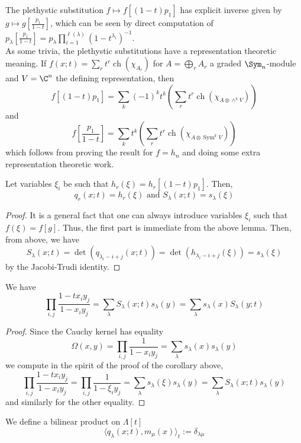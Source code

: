 \documentclass[11pt,leqno,oneside]{amsart}
\numberwithin{thm}{section}
\newcommand{\SymP}{\operatorname{Sym}}
\newcommand{\ExtP}{\wedge}
\newcommand{\sym}{\Lambda}
\newcommand{\ch}{\operatorname{ch}}
\begin{document}
\begin{rmk}\label{plethystic-inverses}
  The plethystic substitution \(f \mapsto f[(1-t)p_1]\) has explicit
  inverse given by \(g \mapsto g[\frac{p_1}{1-t}]\), which can be seen
  by direct computation of \(p_\lambda[\frac{p_1}{1-t}] =
  p_\lambda \prod_{i=1}^{\ell(\lambda)} (1-t^{\lambda_i})^{-1 }\). \\

  As some trivia, the plethystic substitutions have a representation
  theoretic meaning. If \(f(x;t) = \sum_r t^r \ch(\chi_{A_r})\) for \(A =
  \bigoplus_r A_r\) a graded \(\Sym_n\)-module and \(V = \C^n\) the
  defining representation, then \[
    f[(1-t)p_1] = \sum_k (-1)^k t^k \left( \sum_r t^r \ch(\chi_{A
        \otimes \ExtP^k V}) \right) 
  \]
  and \[
    f[\frac{p_1}{1-t}] = \sum_k t^k \left( \sum_r t^r \ch(\chi_{A
        \otimes \SymP^k V}) \right)
  \]
  which follows from proving the result for \(f = h_n\) and doing some
  extra representation theoretic work.
\end{rmk}
\begin{cor}
  Let variables \(\xi_i\) be such that \(h_r(\xi) =
  h_r[(1-t)p_1]\). Then, \[
    q_r(x;t) = h_r(\xi) \text{ and } S_\lambda(x;t) = s_\lambda(\xi)
  \]
\end{cor}
\begin{proof}
  It is a general fact that one can always introduce variables
  \(\xi_i\) such that \(f(\xi) = f[g]\). Thus, the first part is
  immediate from the above lemma. Then, from above, we have \[
    S_\lambda(x;t) = \det(q_{\lambda_i-i+j}(x;t)) =
    \det(h_{\lambda_i-i+j}(\xi)) = s_\lambda(\xi)
  \]
  by the Jacobi-Trudi identity.
\end{proof}
\begin{prop}
  We have \[
    \prod_{i,j} \frac{1-t x_i y_j}{1- x_i y_j} = \sum_{\lambda}
    S_\lambda(x;t) s_\lambda(y) = \sum_\lambda s_\lambda(x) S_\lambda(y;t)
  \]
\end{prop}
\begin{proof}
  Since the Cauchy kernel has equality \[
    \Omega(x,y) = \prod_{i,j} \frac{1}{1-x_i y_j} = \sum_{\lambda} s_\lambda(x) s_\lambda(y)
  \]
  we compute in the spirit of the proof of the corollary above, \[
    \prod_{i,j} \frac{1-t x_i y_j}{1- x_i y_j} = \prod_{i,j}
    \frac{1}{1-\xi_i y_j} = \sum_{\lambda} s_\lambda(\xi) s_\lambda(y)
    = \sum_{\lambda} S_\lambda(x;t) s_\lambda(y)
  \]
  and similarly for the other equality.
\end{proof}
\begin{defn}
  We define a bilinear product on \(\sym[t]\) \[
    \langle q_\lambda(x;t), m_\mu(x) \rangle_t := \delta_{\lambda \mu}
  \]
\end{defn}
\end{document}
